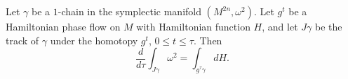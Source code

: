 Let $\gamma$ be a $1$-chain in the symplectic manifold $(M^{2n}, \omega^2)$. Let $g^t$ be a Hamiltonian phase flow on $M$ with Hamiltonian function $H$, and let $J\gamma$ be the track of $\gamma$ under the homotopy $g^t$, $0 \leq t \leq \tau$. Then
$$
\frac{d}{d\tau} \int_{J\gamma} \omega^2 = \int_{g^\tau\gamma} dH.
$$
